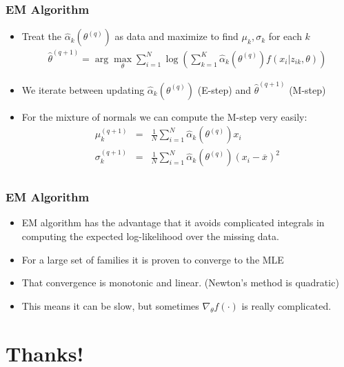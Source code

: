 \documentclass[aspectratio=169]{beamer}
\begin{document}
\begin{frame}
\frametitle{EM Algorithm}
\begin{itemize}
\item Treat the $\hat{\alpha}_k(\theta^{(q)})$ as data and maximize to find $\mu_k,\sigma_k$ for each $k$
\begin{eqnarray*}
\hat{\theta}^{(q+1)} = \arg \max_{\theta}  \sum_{i=1}^N  \log \left( \sum_{k=1}^K \hat{\alpha}_k(\theta^{(q)}) f(x_i | z_{ik}, \theta ) \right)
\end{eqnarray*}
\item We iterate between updating $\hat{\alpha}_k(\theta^{(q)})$ (E-step) and $\hat{\theta}^{(q+1)}$ (M-step)
\item For the mixture of normals we can compute the M-step very easily:
\begin{eqnarray*}
\mu_k^{(q+1)} &=& \frac{1}{N} \sum_{i=1}^N \hat{\alpha}_k(\theta^{(q)}) x_{i}\\
\sigma_k^{(q+1)} &=& \frac{1}{N} \sum_{i=1}^N \hat{\alpha}_k(\theta^{(q)}) (x_{i} - \overline{x})^2 \\
\end{eqnarray*}
\end{itemize}
\end{frame}

\begin{frame}
\frametitle{EM Algorithm}
\begin{itemize}
\item EM algorithm has the advantage that it avoids complicated integrals in computing the expected log-likelihood over the missing data.
\item For a large set of families it is proven to converge to the MLE
\item That convergence is \alert{monotonic} and \alert{linear}. (Newton's method is quadratic)
\item This means it can be slow, but sometimes $\nabla_{\theta} f (\cdot)$ is really complicated.
\end{itemize}
\end{frame}

\section*{Thanks!}
\end{document}
